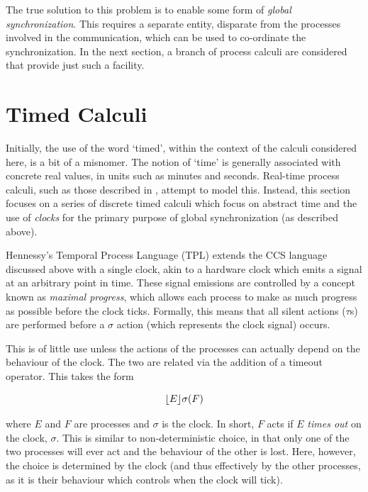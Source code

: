 The true solution to this problem is to enable some form of
\emph{global synchronization}.  This requires a separate entity,
disparate from the processes involved in the communication, which can
be used to co-ordinate the synchronization.  In the next section, a
branch of process calculi are considered that provide just such a facility.

\section{Timed Calculi}
\label{timing}

Initially, the use of the word `timed', within the context of the
calculi considered here, is a bit of a misnomer.  The notion of `time'
is generally associated with concrete real values, in units such as
minutes and seconds.  Real-time process calculi, such as those
described in \cite{tccs, satoh:phd, satoh:distrib, lee:realtime,
  aceto:timing, beaten:timing, brics:lee}, attempt to model this.
Instead, this section focuses on a series of discrete timed calculi
which focus on abstract time and the use of \emph{clocks} for the
primary purpose of global synchronization (as described above).

Hennessy's Temporal Process Language (TPL) \cite{hennessy:tpl} extends
the CCS language discussed above with a single clock, akin to a
hardware clock which emits a signal at an arbitrary point in time.
These signal emissions are controlled by a concept known as
\emph{maximal progress}, which allows each process to make as much
progress as possible before the clock ticks.  Formally, this means
that all silent actions ($\tau$s) are performed before a $\sigma$
action (which represents the clock signal) occurs.

This is of little use unless the actions of the processes can actually
depend on the behaviour of the clock.  The two are related via the
addition of a timeout operator.  This takes the form

\begin{equation}
\lfloor{E}\rfloor {\sigma} ({F})
\end{equation}

\noindent where $E$ and $F$ are processes and $\sigma$ is the clock.  In
short, $F$ acts if $E$ \emph{times out} on the clock, $\sigma$.  This is
similar to non-deterministic choice, in that only one of the two
processes will ever act and the behaviour of the other is lost.  Here,
however, the choice is determined by the clock (and thus effectively by
the other processes, as it is their behaviour which controls when the
clock will tick).

